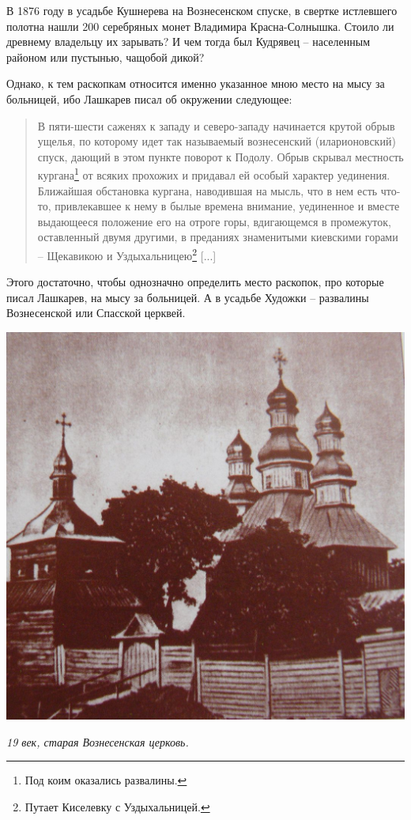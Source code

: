 В 1876 году в усадьбе Кушнерева на Вознесенском спуске, в свертке истлевшего полотна нашли 200 серебряных монет Владимира Красна-Солнышка. Стоило ли древнему владельцу их зарывать? И чем тогда был Кудрявец – населенным районом или пустынью, чащобой дикой?


Однако, к тем раскопкам относится именно указанное мною место на мысу за больницей, ибо Лашкарев писал об окружении следующее:

\begin{quotation}
В пяти-шести саженях к западу и северо-западу начинается крутой обрыв ущелья, по которому идет так называемый вознесенский (иларионовский) спуск, дающий в этом пункте поворот к Подолу. Обрыв скрывал местность кургана\footnote{Под коим оказались развалины.} от всяких прохожих и придавал ей особый характер уединения. Ближайшая обстановка кургана, наводившая на мысль, что в нем есть что-то, привлекавшее к нему в былые времена внимание, уединенное и вместе выдающееся положение его на отроге горы, вдигающемся в промежуток, оставленный двумя другими, в преданиях знаменитыми киевскими горами – Щекавикою и Уздыхальницею\footnote{Путает Киселевку с Уздыхальницей.} [...]\end{quotation}

Этого достаточно, чтобы однозначно определить место раскопок, про которые писал Лашкарев, на мысу за больницей. А в усадьбе Художки – развалины Вознесенской или Спасской церквей.

\vspace*{\fill}

\begin{center}
\includegraphics[width=0.85\linewidth]{chast-colebanie-osnov/gora-zamkovaya-valovaya/vozncerk.jpg}

\textit{19 век, старая Вознесенская церковь.}
\end{center}

